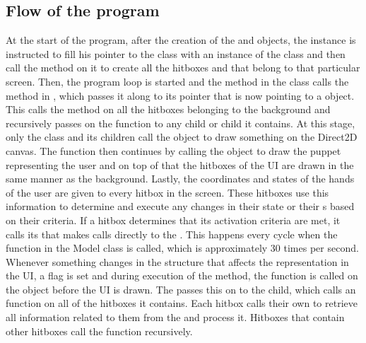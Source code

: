 \subsection{Flow of the program}

At the start of the program, after the creation of the  and  objects, the  instance is instructed to fill his pointer to the  class with an instance of the  class and then call the method  on it to create all the hitboxes and  that belong to that particular screen. Then, the program loop is started and the  method in the  class calls the  method in , which passes it along to its pointer  that is now pointing to a  object. This calls the  method on all the hitboxes belonging to the background and recursively passes on the  function to any  child or  child it contains. At this stage, only the  class and its children call the  object to draw something on the Direct2D canvas. The  function then continues by calling the  object to draw the puppet representing the user and on top of that the hitboxes of the UI are drawn in the same manner as the background. Lastly, the coordinates and states of the hands of the user are given to every hitbox in the screen. These hitboxes use this information to determine and execute any changes in their state or their s based on their criteria. If a hitbox determines that its activation criteria are met, it calls its  that makes calls directly to the . This happens every cycle when the  function in the Model class is called, which is approximately 30 times per second.\\

Whenever something changes in the  structure that affects the representation in the UI, a flag is set and during execution of the   method, the  function is called on the  object before the UI is drawn. The  passes this on to the  child, which calls an  function on all of the hitboxes it contains. Each hitbox calls their own  to retrieve all information related to them from the  and process it. Hitboxes that contain other hitboxes call the  function recursively.


